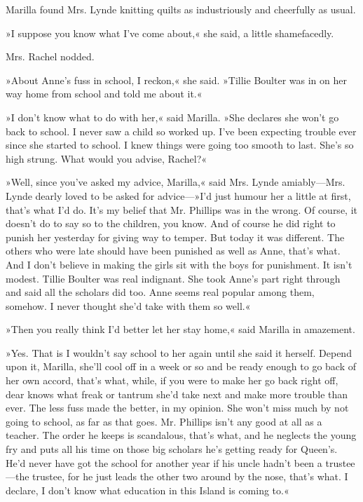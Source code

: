Marilla found Mrs. Lynde knitting quilts as industriously and cheerfully as usual.

»I suppose you know what I’ve come about,« she said, a little shamefacedly.

Mrs. Rachel nodded.

»About Anne’s fuss in school, I reckon,« she said. »Tillie Boulter was in on her way home from school and told me about it.«

»I don’t know what to do with her,« said Marilla. »She declares she won’t go back to school. I never saw a child so worked up. I’ve been expecting trouble ever since she started to school. I knew things were going too smooth to last. She’s so high strung. What would you advise, Rachel?«

»Well, since you’ve asked my advice, Marilla,« said Mrs. Lynde amiably—Mrs. Lynde dearly loved to be asked for advice—»I’d just humour her a little at first, that’s what I’d do. It’s my belief that Mr. Phillips was in the wrong. Of course, it doesn’t do to say so to the children, you know. And of course he did right to punish her yesterday for giving way to temper. But today it was different. The others who were late should have been punished as well as Anne, that’s what. And I don’t believe in making the girls sit with the boys for punishment. It isn’t modest. Tillie Boulter was real indignant. She took Anne’s part right through and said all the scholars did too. Anne seems real popular among them, somehow. I never thought she’d take with them so well.«

»Then you really think I’d better let her stay home,« said Marilla in amazement.

»Yes. That is I wouldn’t say school to her again until she said it herself. Depend upon it, Marilla, she’ll cool off in a week or so and be ready enough to go back of her own accord, that’s what, while, if you were to make her go back right off, dear knows what freak or tantrum she’d take next and make more trouble than ever. The less fuss made the better, in my opinion. She won’t miss much by not going to school, as far as that goes. Mr. Phillips isn’t any good at all as a teacher. The order he keeps is scandalous, that’s what, and he neglects the young fry and puts all his time on those big scholars he’s getting ready for Queen’s. He’d never have got the school for another year if his uncle hadn’t been a trustee—the trustee, for he just leads the other two around by the nose, that’s what. I declare, I don’t know what education in this Island is coming to.«

